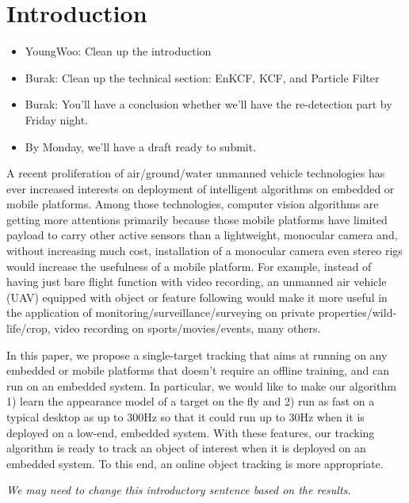 \documentclass[10pt,twocolumn,letterpaper]{article}
\newcounter{ct}
\begin{document}
\section{Introduction}
\begin{itemize}
\item YoungWoo: Clean up the introduction
\item Burak: Clean up the technical section: EnKCF, KCF, and Particle Filter
\item Burak: You'll have a conclusion whether we'll have the re-detection part by Friday night.
\item By Monday, we'll have a draft ready to submit.
\end{itemize}

A recent proliferation of air/ground/water unmanned vehicle
technologies has ever increased interests on deployment of intelligent
algorithms on embedded or mobile platforms. Among those technologies,
computer vision algorithms are getting more attentions primarily
because those mobile platforms have limited payload to carry other
active sensors than a lightweight, monocular camera and, without
increasing much cost, installation of a monocular camera even stereo
rigs would increase the usefulness of a mobile platform. For example,
instead of having just bare flight function with video recording, an
unmanned air vehicle (UAV) equipped with object or feature following
would make it more useful in the application of
monitoring/surveillance/surveying on private
properties/wild-life/crop, video recording on sports/movies/events,
many others.

In this paper, we propose a single-target tracking that aims at
running on any embedded or mobile platforms that doesn't require an
offline training, and can run on an embedded system. In particular, we
would like to make our algorithm 1) learn the appearance model of a
target on the fly and 2) run as fast on a typical desktop as up to
300Hz so that it could run up to 30Hz when it is deployed on a
low-end, embedded system. With these features, our tracking algorithm
is ready to track an object of interest when it is deployed on an
embedded system. To this end, an online object tracking is more
appropriate.

{\it We may need to change this introductory sentence based on the
  results.}
\end{document}

